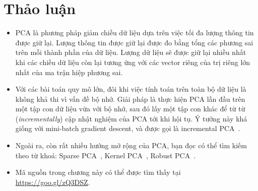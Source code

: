\section{Thảo luận}
\begin{itemize}
\item PCA là phương pháp giảm chiều dữ liệu dựa trên việc tối đa lượng
thông tin được giữ lại. Lượng thông tin được giữ lại được đo bằng tổng các
phương sai trên mỗi thành phần của dữ liệu. Lượng dữ liệu sẽ được giữ lại nhiều
nhất khi các chiều dữ liệu còn lại tương ứng với các vector riêng của trị riêng
lớn nhất của ma trận hiệp phương sai.

\item Với các bài toán quy mô lớn, đôi khi việc tính toán trên toàn bộ dữ liệu
là không khả thi vì vấn đề bộ nhớ. Giải pháp là thực hiện PCA lần đầu
trên một tập con dữ liệu vừa với bộ nhớ, sau đó lấy một tập con khác để {từ từ} (\textit{incrementally}) cập nhật nghiệm của PCA tới khi hội
tụ. Ý tưởng này khá giống với mini-batch gradient descent, và được gọi là
incremental PCA~\cite{zhao2006novel}.
 
\item Ngoài ra, còn rất nhiều hướng mở rộng của PCA, bạn đọc có thể tìm kiếm
theo từ khoá: Sparse PCA~\cite{d2005direct}, Kernel PCA~\cite{mika1999kernel},
Robust PCA~\cite{candes2011robust}. 

\item Mã nguồn trong chương này có thể được tìm thấy tại
\url{https://goo.gl/zQ3DSZ}. 
\end{itemize}
 